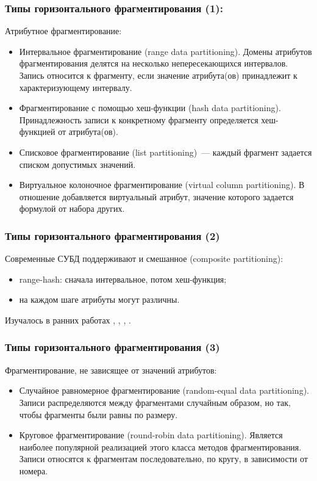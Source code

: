 \documentclass[unicode]{beamer}
\begin{document}
\begin{frame}
\frametitle{Типы горизонтального фрагментирования (1): \cite{p16, p17}}

Атрибутное фрагментирование:
\small{
\begin{itemize}
  \item Интервальное фрагментирование (range data partitioning). Домены атрибутов фрагментирования делятся на несколько непересекающихся интервалов. Запись относится к фрагменту, если значение атрибута(ов) принадлежит к характеризующему интервалу.
  \item Фрагментирование с помощью хеш-функции (hash data partitioning). Принадлежность записи к конкретному фрагменту определяется хеш-функцией от атрибута(ов).
  \item Списковое фрагментирование (list partitioning)~--- каждый фрагмент задается списком допустимых значений.
  \item Виртуальное колоночное фрагментирование (virtual column partitioning). В отношение добавляется виртуальный атрибут, значение которого задается формулой от набора других. 
\end{itemize}
}
\end{frame}

\begin{frame}
\frametitle{Типы горизонтального фрагментирования (2)}

Современные СУБД поддерживают и смешанное (composite partitioning): 
\begin{itemize}
  \setlength\itemsep{1em}	
  \item range-hash: сначала интервальное, потом хеш-функция;
  \item на каждом шаге атрибуты могут различны.
\end{itemize}

Изучалось в ранних работах \cite{p41}, \cite{p38}, \cite{p40}, \cite{p39}.

\end{frame}

\begin{frame}
\frametitle{Типы горизонтального фрагментирования (3)}

Фрагментирование, не зависящее от значений атрибутов:
\begin{itemize}
  \setlength\itemsep{1em}

  \item Случайное равномерное фрагментирование (random-equal data partitioning).  Записи распределяются между фрагментами случайным образом, но так, чтобы фрагменты были равны по размеру.

  \item Круговое фрагментирование (round-robin data partitioning). Является наиболее популярной реализацией этого класса методов фрагментирования. Записи относятся к фрагментам последовательно, по кругу, в зависимости от номера.
\end{itemize}

\end{frame}
\end{document}

